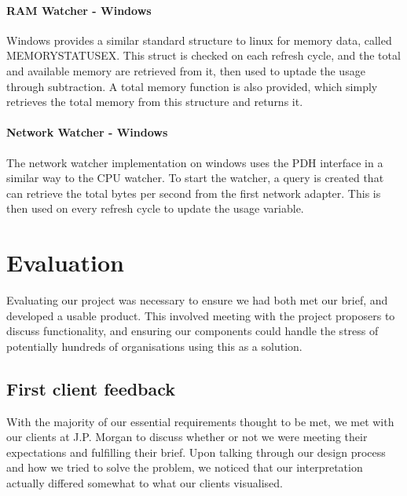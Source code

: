 \documentclass{l3proj}
\begin{document}
\subsubsection{RAM Watcher - Windows}

Windows provides a similar standard structure to linux for memory data, called MEMORYSTATUSEX. This struct is checked on each refresh cycle, and the total and available memory are retrieved from it, then used to uptade the usage through subtraction. A total memory function is also provided, which simply retrieves the total memory from this structure and returns it.

\subsubsection{Network Watcher - Windows}

The network watcher implementation on windows uses the PDH interface in a similar way to the CPU watcher. To start the watcher, a query is created that can retrieve the total bytes per second from the first network adapter. This is then used on every refresh cycle to update the usage variable.



\chapter{Evaluation}

Evaluating our project was necessary to ensure we had both met our brief, and developed a usable product. This involved meeting with the project proposers to discuss functionality, and ensuring our components could handle the stress of potentially hundreds of organisations using this as a solution.


\section{First client feedback}

With the majority of our essential requirements thought to be met, we met with our clients at J.P. Morgan to discuss whether or not we were meeting their expectations and fulfilling their brief. Upon talking through our design process and how we tried to solve the problem, we noticed that our interpretation actually differed somewhat to what our clients visualised.
\end{document}
